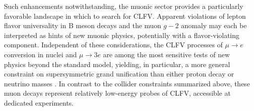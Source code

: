 \documentclass{book}[letterpaper,12pt]
\begin{document}
Such enhancements notwithstanding, the muonic sector provides a particularly favorable landscape in which to search for CLFV. Apparent violations of lepton flavor universality in B meson decays and the muon $g-2$ anomaly may each be interpreted as hints of new muonic physics, potentially with a flavor-violating component. Independent of these considerations, the CLFV processes of $\mu\rightarrow e$ conversion in nuclei and $\mu\rightarrow 3e$ are among the most sensitive tests of new physics beyond the standard model, yielding, in particular, a more general constraint on supersymmetric grand unification than either proton decay or neutrino masses \cite{Barbieri_1994}.  In contrast to the collider constraints summarized above, these muon decays represent relatively low-energy probes of CLFV, accessible at dedicated experiments.
\end{document}
